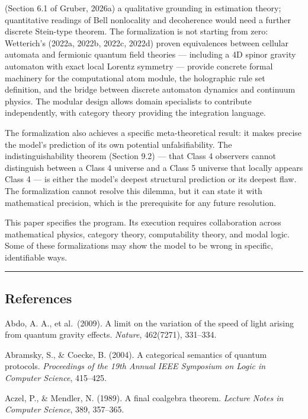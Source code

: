 \documentclass[
]{article}
\begin{document}
(Section 6.1 of Gruber, 2026a) a qualitative grounding in estimation
theory; quantitative readings of Bell nonlocality and decoherence would
need a further discrete Stein-type theorem. The formalization is not
starting from zero: Wetterich's (2022a, 2022b, 2022c, 2022d) proven
equivalences between cellular automata and fermionic quantum field
theories --- including a 4D spinor gravity automaton with exact local
Lorentz symmetry --- provide concrete formal machinery for the
computational atom module, the holographic rule set definition, and the
bridge between discrete automaton dynamics and continuum physics. The
modular design allows domain specialists to contribute independently,
with category theory providing the integration language.

The formalization also achieves a specific meta-theoretical result: it
makes precise the model's prediction of its own potential
unfalsifiability. The indistinguishability theorem (Section 9.2) ---
that Class 4 observers cannot distinguish between a Class 4 universe and
a Class 5 universe that locally appears Class 4 --- is either the
model's deepest structural prediction or its deepest flaw. The
formalization cannot resolve this dilemma, but it can state it with
mathematical precision, which is the prerequisite for any future
resolution.

This paper specifies the program. Its execution requires collaboration
across mathematical physics, category theory, computability theory, and
modal logic. Some of these formalizations may show the model to be wrong
in specific, identifiable ways.

\begin{center}\rule{0.5\linewidth}{0.5pt}\end{center}

\hypertarget{references}{%
\subsection{References}\label{references}}

Abdo, A. A., et al.~(2009). A limit on the variation of the speed of
light arising from quantum gravity effects. \emph{Nature}, 462(7271),
331--334.

Abramsky, S., \& Coecke, B. (2004). A categorical semantics of quantum
protocols. \emph{Proceedings of the 19th Annual IEEE Symposium on Logic
in Computer Science}, 415--425.

Aczel, P., \& Mendler, N. (1989). A final coalgebra theorem.
\emph{Lecture Notes in Computer Science}, 389, 357--365.
\end{document}
